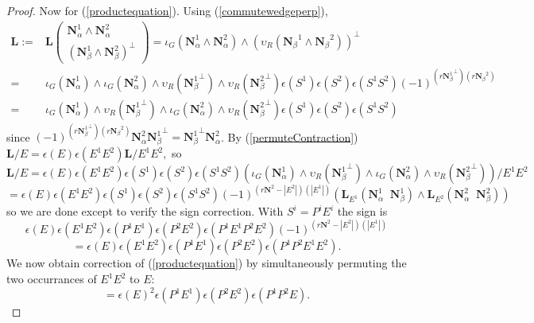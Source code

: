 \documentclass[Unicode]{cedram-alco}
\newcommand{\ext}[1]{\ensuremath{\mathbf{#1}}}
\newcommand{\Is}{\ensuremath{\iota}}
\newcommand{\Vs}{\ensuremath{\upsilon}}
\newcommand{\LHorSub}[3]{\ext{L}_{#1}\left(  {#2}\;\; {#3}  \right)}
\begin{document}
\begin{proof}
Now for (\ref{productequation}).  Using (\ref{commutewedgeperp}),
\begin{equation*}
  \begin{split}
    \ext{L} := & \ext{L}\left(
    \begin{array}{c}
      \ext{N}^{1}_\alpha\wedge \ext{N}^{2}_\alpha
      \\     
      (\ext{N}^{1}_\beta\wedge\ext{N}^{2}_\beta)^\perp
    \end{array} \right)
  =\Is_G(\ext{N}_\alpha^{1}\wedge \ext{N}_\alpha^{2})
  \wedge\left(\Vs_R({\ext{N}_\beta}^{1}\wedge{\ext{N}_\beta}^{2})\right)^\perp
  \\
  =&
  \Is_G(\ext{N}_\alpha^{1})\wedge \Is_G(\ext{N}_\alpha^{2})
  \wedge\Vs_R({\ext{N}_\beta^{1}}^\perp)\wedge\Vs_R({\ext{N}_\beta^{2}}^\perp)
  \epsilon(S^{1})\epsilon(S^{2})\epsilon(S^{1}S^{2})(-1)^{(r{\ext{N}_\beta^{1}}^\perp)( r{\ext{N}_\beta}^{2})}
  \\
  =& 
    \Is_G(\ext{N}_\alpha^{1}) \wedge \Vs_R({\ext{N}_\beta^{1}}^\perp) \wedge
    \Is_G(\ext{N}_\alpha^{2}) \wedge \Vs_R({\ext{N}_\beta^{2}}^\perp)
    \epsilon(S^{1})\epsilon(S^{2})\epsilon(S^{1}S^{2})
  \end{split}
\end{equation*}
since $(-1)^{(r{\ext{N}_\beta^{1}}^\perp)( r{\ext{N}_\beta}^{2})} \ext{N}_\alpha^{2} {\ext{N}_\beta^{1}}^\perp
={\ext{N}_\beta^{1}}^\perp \ext{N}_\alpha^{2}$.  By (\ref{permuteContraction})
$
\ext{L}/E = \epsilon(E)\epsilon(E^{1} E^{2})\ext{L}/E^{1}E^{2},
$ so
\[
\ext{L}/E = \epsilon(E)\epsilon(E^{1} E^{2})\epsilon(S^{1})\epsilon(S^{2})\epsilon(S^{1}S^{2})
\left(
 \Is_G(\ext{N}_\alpha^{1}) \wedge \Vs_R({\ext{N}_\beta^{1}}^\perp) \wedge
    \Is_G(\ext{N}_\alpha^{2}) \wedge \Vs_R({\ext{N}_\beta^{2}}^\perp)
\right)/E^1E^2
\]
\[
=\epsilon(E)\epsilon(E^{1} E^{2})\epsilon(S^{1})\epsilon(S^{2})\epsilon(S^{1}S^{2})
(-1)^{(r\ext{N}^2-|E^2|)(|E^1|)}
\left(\LHorSub{E^{1}}{\ext{N}_\alpha^{1}}{\ext{N}_\beta^{1}}
        \wedge
        \LHorSub{E^{2}}{\ext{N}_\alpha^{2}}{\ext{N}_\beta^{2}}
          \right)
          \]
so we are done except to verify the sign correction.  With $S^i=P^iE^i$ the sign is
\[
\epsilon(E)\epsilon(E^{1} E^{2})\epsilon(P^1E^1)\epsilon(P^{2}E^2)\epsilon(P^1E^1P^2E^2)
(-1)^{(r\ext{N}^2-|E^2|)(|E^1|)}
\]
\[
=\epsilon(E)\epsilon(E^{1} E^{2})\epsilon(P^1E^1)\epsilon(P^{2}E^2)\epsilon(P^1P^2E^1E^2).
\]
We now obtain correction of (\ref{productequation}) by simultaneously permuting the two occurrances of $E^1E^2$
to $E$:
\[
=\epsilon(E)^2\epsilon(P^1E^1)\epsilon(P^{2}E^2)\epsilon(P^1P^2E).
\]



\end{proof}
\end{document}
